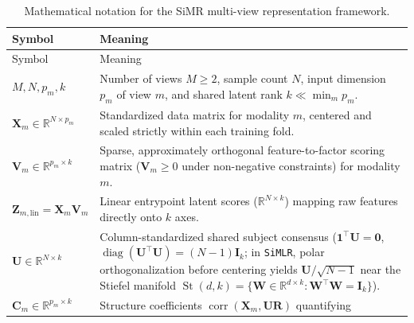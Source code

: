 \documentclass[
  10pt,
  letterpaper,
]{report}
\begin{document}
\begin{longtable}[]{@{}
  >{\raggedright\arraybackslash}p{}
  >{\raggedright\arraybackslash}p{}@{}}
\caption{Mathematical notation for the SiMR multi-view representation
framework.}\label{tbl-notation}\tabularnewline
\toprule\noalign{}
\begin{minipage}[b]{\linewidth}\raggedright
Symbol
\end{minipage} & \begin{minipage}[b]{\linewidth}\raggedright
Meaning
\end{minipage} \\
\midrule\noalign{}
\endfirsthead
\toprule\noalign{}
\begin{minipage}[b]{\linewidth}\raggedright
Symbol
\end{minipage} & \begin{minipage}[b]{\linewidth}\raggedright
Meaning
\end{minipage} \\
\midrule\noalign{}
\endhead
\bottomrule\noalign{}
\endlastfoot
\(M, N, p_m, k\) & Number of views \(M \ge 2\), sample count \(N\),
input dimension \(p_m\) of view \(m\), and shared latent rank
\(k \ll \min_m p_m\). \\
\(\mathbf{X}_m \in \mathbb{R}^{N \times p_m}\) & Standardized data
matrix for modality \(m\), centered and scaled strictly within each
training fold. \\
\(\mathbf{V}_m \in \mathbb{R}^{p_m \times k}\) & Sparse, approximately
orthogonal feature-to-factor scoring matrix (\(\mathbf{V}_m \ge 0\)
under non-negative constraints) for modality \(m\). \\
\(\mathbf{Z}_{m,\text{lin}} = \mathbf{X}_m \mathbf{V}_m\) & Linear
entrypoint latent scores (\(\mathbb{R}^{N \times k}\)) mapping raw
features directly onto \(k\) axes. \\
\(\mathbf{U} \in \mathbb{R}^{N \times k}\) & Column-standardized shared
subject consensus (\(\mathbf{1}^\top \mathbf{U} = \mathbf{0}\),
\(\operatorname{diag}(\mathbf{U}^\top \mathbf{U}) = (N - 1)\mathbf{I}_k\);
in \texttt{SiMLR}, polar orthogonalization before centering yields
\(\mathbf{U}/\sqrt{N - 1}\) near the Stiefel manifold
\(\operatorname{St}(d, k) = \{\mathbf{W} \in \mathbb{R}^{d \times k} : \mathbf{W}^\top \mathbf{W} = \mathbf{I}_k\}\)). \\
\(\mathbf{C}_m \in \mathbb{R}^{p_m \times k}\) & Structure coefficients
\(\operatorname{corr}(\mathbf{X}_m, \mathbf{U}\mathbf{R})\) quantifying

\end{longtable}
\end{document}
